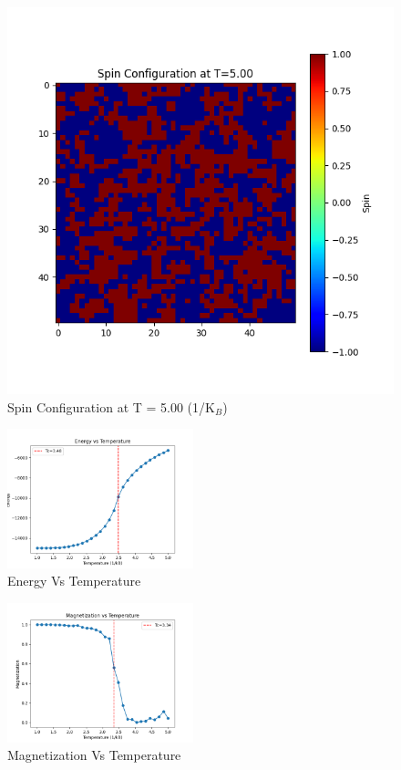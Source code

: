 \documentclass[11pt]{article}
\begin{document}
\begin{figure}[H]
    \centering
    \begin{minipage}{0.32\textwidth}
        \centering
        \includegraphics[width=\textwidth]{Spin_Configuration_at_T=5.00.png}
        \caption{Spin Configuration at T = 5.00 (1/K$_B$)}
        \label{fig:16}
    \end{minipage}
\end{figure}

\begin{figure}[H]
    \centering
    \includegraphics[width=0.48\textwidth, keepaspectratio]{Energy_vs_Temperature.png}
    \caption{Energy Vs Temperature}
    \label{fig:17}
\end{figure}

\begin{figure}[H]
    \centering
    \includegraphics[width=0.48\textwidth, keepaspectratio]{Magnetization_vs_Temperature.png}
    \caption{Magnetization Vs Temperature}
    \label{fig:18}
\end{figure}
\end{document}
